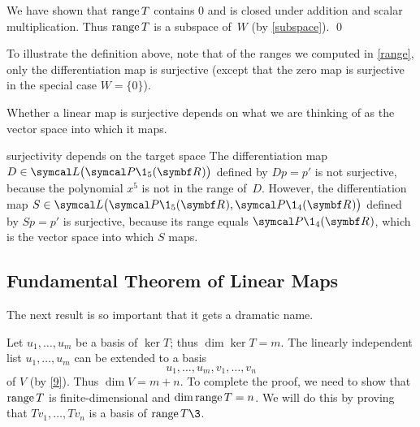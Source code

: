 We have shown that $\operatorname{range} T$ contains $0$ and is closed under
addition and scalar multiplication.  Thus $\operatorname{range} T$ is a subspace of~$W$ (by \ref{subspace}).
\qed


To illustrate the definition above, note that of the ranges we computed in \ref{range}, only the differentiation map is surjective (except that the zero map is surjective in the special case $W = \{0\}$).


Whether a linear map is surjective depends on what
we are thinking of as the vector space into which it maps.

\begin{example}{surjectivity depends on the target space}
The differentiation map $D \in \L\bigl(\P\1_5(\R{})\bigr)$
defined by $Dp = p'$ is not surjective, because the polynomial $x^5$
is not in the range of~$D$.  However, the differentiation map
$S \in \L\bigl(\P\1_5(\R{}), \P\1_4(\R{})\bigr)$ defined by $Sp = p'$ is
surjective, because its range equals $\P\1_4(\R{})$, which is the
vector space into which $S$ maps.
\end{example}

\subsection{Fundamental Theorem of Linear Maps}

The next result is so important that it gets a dramatic name.


\proof
Let $u_1, \dots, u_m$  be a basis of $\ker T$; thus \mbox{$\dim \ker
T = m$}.  The  linearly independent list $u_1, \dots, u_m$ can be extended to a
basis
\[
u_1, \dots, u_m, v_1, \dots, v_n
\]
of $V$ (by \ref{9}). Thus
$\dim V = m + n$. To complete the proof, we need to show that $\operatorname{range} T$ is
finite-dimensional and $\dim \operatorname{range} T =  n$.  We will do this by proving that
$Tv_1, \dots, Tv_n$ is a basis of $\ran T\3$.

